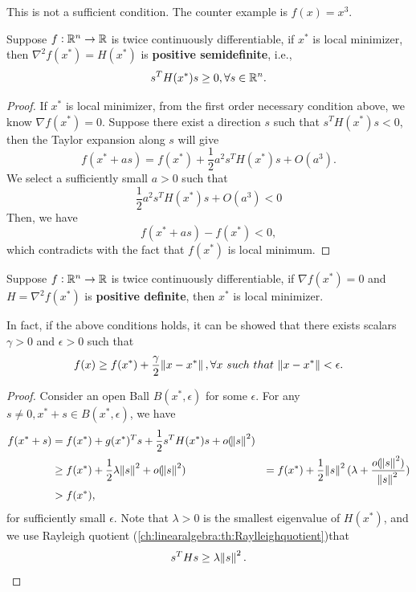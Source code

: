 \begin{refsection}
\begin{remark}
This is not a sufficient condition. The counter example is $f(x)=x^3$.
\end{remark}

\begin{theorem}\label{ch:unconstrained-mathematical-optimization:th:secondOrderNecessaryCondition} Suppose $f:\mathbb{R}^n\rightarrow \mathbb{R}$ is twice continuously differentiable, if $x^*$ is local minimizer, then $\nabla^2 f(x^*) = H(x^*)$ is \textbf{positive semidefinite}, i.e., 
$$s^TH(x^*)s \geq 0, \forall s\in \mathbb{R}^n.$$	
\end{theorem}
\begin{proof}
If $x^*$ is local minimizer, from the first order necessary condition above, we know $\nabla f(x^*) = 0$. 
Suppose there exist a direction $s$ such that $s^TH(x^*)s < 0$, then the Taylor expansion along $s$ will give
$$f(x^* + as) = f(x^*) + \frac{1}{2}a^2 s^T H(x^*) s + O(a^3).$$
We select a sufficiently small $a > 0$ such that
$$\frac{1}{2}a^2 s^T H(x^*) s + O(a^3) < 0$$
Then, we have
$$f(x^* + as) - f(x^*) < 0,$$
which contradicts with the fact that $f(x^*)$ is local minimum.
\end{proof}


\begin{theorem}\label{ch:unconstrained-mathematical-optimization:th:secondOrderSufficientCondition}\cite{bertsekas2016nonlinear}
Suppose $f:\mathbb{R}^n\rightarrow \mathbb{R}$ is twice continuously differentiable, if $\nabla f(x^*) = 0$ and $H = \nabla^2 f(x^*)$ is \textbf{positive definite}, then $x^*$ is local minimizer. 

In fact, if the above conditions holds, it can be showed that there exists scalars $\gamma > 0$ and $\epsilon > 0$ such that
$$f(x) \geq f(x^*) + \frac{\gamma}{2}\norm{x - x^*},\forall x ~such~that~ \norm{x - x^*} < \epsilon.$$
\end{theorem}
\begin{proof}
Consider an open Ball $B(x^*,\epsilon)$ for some $\epsilon$. For any $s\neq 0,x^* + s\in B(x^*,\epsilon)$, we have
\begin{align*}
f(x^* + s) &= f(x^*) + g(x^*)^Ts + \frac{1}{2}s^TH(x^*)s + o(\norm{s}^2)\\
&\geq f(x^*) + \frac{1}{2}\lambda \norm{s}^2 + o(\norm{s}^2)
&=f(x^*) + \frac{1}{2}\norm{s}^2(\lambda + \frac{o(\norm{s}^2)}{\norm{s}^2})\\
&>f(x^*),
\end{align*}
for sufficiently small $\epsilon$. Note that $\lambda > 0$ is the smallest eigenvalue of $H(x^*)$, and we use Rayleigh quotient (\autoref{ch:linearalgebra:th:Raylleighquotient})that
$$s^THs \geq \lambda \norm{s}^2.$$
\end{proof}


\end{refsection}

